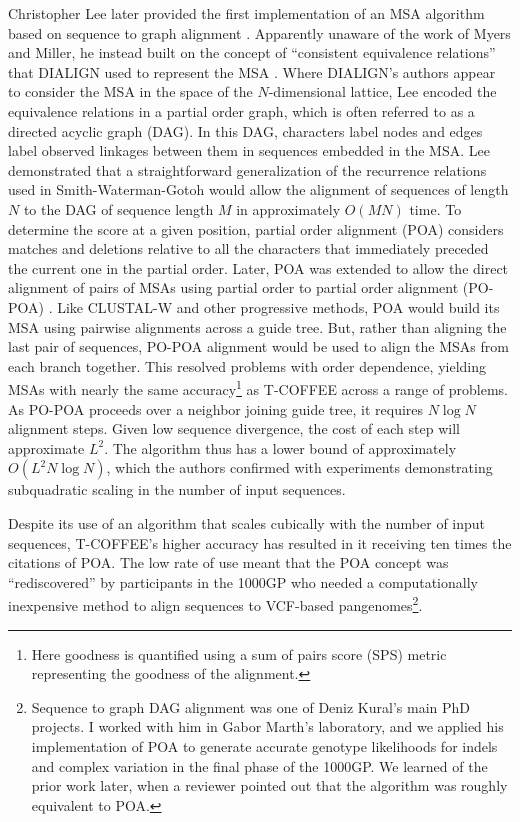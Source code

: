 Christopher Lee later provided the first implementation of an MSA algorithm based on sequence to graph alignment \cite{lee2002POA}.
Apparently unaware of the work of Myers and Miller, he instead built on the concept of ``consistent equivalence relations'' that DIALIGN used to represent the MSA \cite{morgenstern1996multiple}.
Where DIALIGN's authors appear to consider the MSA in the space of the $N$-dimensional lattice, Lee encoded the equivalence relations in a partial order graph, which is often referred to as a directed acyclic graph (DAG).
In this DAG, characters label nodes and edges label observed linkages between them in sequences embedded in the MSA.
Lee demonstrated that a straightforward generalization of the recurrence relations used in Smith-Waterman-Gotoh would allow the alignment of sequences of length $N$ to the DAG of sequence length $M$ in approximately $O(MN)$ time.
To determine the score at a given position, partial order alignment (POA) considers matches and deletions relative to all the characters that immediately preceded the current one in the partial order.
Later, POA was extended to allow the direct alignment of pairs of MSAs using partial order to partial order alignment (PO-POA) \cite{grasso2004combining}.
Like CLUSTAL-W and other progressive methods, POA would build its MSA using pairwise alignments across a guide tree.
But, rather than aligning the last pair of sequences, PO-POA alignment would be used to align the MSAs from each branch together.
This resolved problems with order dependence, yielding MSAs with nearly the same accuracy\footnote{Here goodness is quantified using a sum of pairs score (SPS) metric representing the goodness of the alignment.} as T-COFFEE across a range of problems.
As PO-POA proceeds over a neighbor joining guide tree, it requires $N \log{N}$ alignment steps.
Given low sequence divergence, the cost of each step will approximate $L^2$.
The algorithm thus has a lower bound of approximately $O(L^{2}N\log{N})$, which the authors confirmed with experiments demonstrating subquadratic scaling in the number of input sequences.

Despite its use of an algorithm that scales cubically with the number of input sequences, T-COFFEE's higher accuracy has resulted in it receiving ten times the citations of POA.
The low rate of use meant that the POA concept was ``rediscovered'' by participants in the 1000GP who
needed a computationally inexpensive method to align sequences to VCF-based pangenomes\footnote{Sequence to graph DAG alignment was one of Deniz Kural's main PhD projects. I worked with him in Gabor Marth's laboratory, and we applied his implementation of POA to generate accurate genotype likelihoods for indels and complex variation in the final phase of the 1000GP. We learned of the prior work later, when a reviewer pointed out that the algorithm was roughly equivalent to POA.}.

